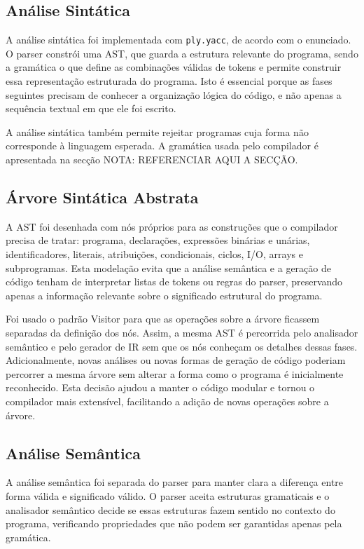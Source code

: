 \documentclass[11pt,a4paper]{report}
\begin{document}
\subsection{Análise Sintática}

A análise sintática foi implementada com \texttt{ply.yacc}, de acordo com o enunciado. O parser constrói uma AST, que guarda a estrutura relevante do programa, sendo a gramática o que define as combinações válidas de tokens e permite construir essa representação estruturada do programa. Isto é essencial porque as fases seguintes precisam de conhecer a organização lógica do código, e não apenas a sequência textual em que ele foi escrito.

A análise sintática também permite rejeitar programas cuja forma não corresponde à linguagem esperada. A gramática usada pelo compilador é apresentada na secção NOTA: REFERENCIAR AQUI A SECÇÃO.

\subsection{Árvore Sintática Abstrata}

A AST foi desenhada com nós próprios para as construções que o compilador precisa de tratar: programa, declarações, expressões binárias e unárias, identificadores, literais, atribuições, condicionais, ciclos, I/O, arrays e subprogramas. Esta modelação evita que a análise semântica e a geração de código tenham de interpretar listas de tokens ou regras do parser, preservando apenas a informação relevante sobre o significado estrutural do programa.

Foi usado o padrão Visitor para que as operações sobre a árvore ficassem separadas da definição dos nós. Assim, a mesma AST é percorrida pelo analisador semântico e pelo gerador de IR sem que os nós conheçam os detalhes dessas fases. Adicionalmente, novas análises ou novas formas de geração de código poderiam percorrer a mesma árvore sem alterar a forma como o programa é inicialmente reconhecido. Esta decisão ajudou a manter o código modular e tornou o compilador mais extensível, facilitando a adição de novas operações sobre a árvore.

\subsection{Análise Semântica}

A análise semântica foi separada do parser para manter clara a diferença entre forma válida e significado válido. O parser aceita estruturas gramaticais e o analisador semântico decide se essas estruturas fazem sentido no contexto do programa, verificando propriedades que não podem ser garantidas apenas pela gramática. 
\end{document}
